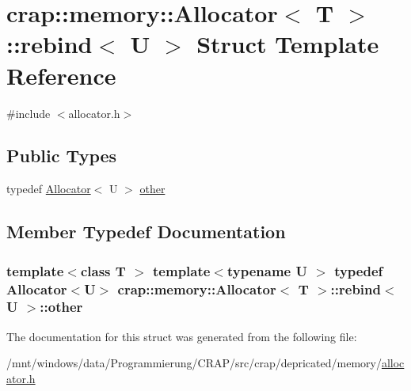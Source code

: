 \hypertarget{structcrap_1_1memory_1_1_allocator_1_1rebind}{\section{crap\-:\-:memory\-:\-:Allocator$<$ T $>$\-:\-:rebind$<$ U $>$ Struct Template Reference}
\label{structcrap_1_1memory_1_1_allocator_1_1rebind}
}


{\ttfamily \#include $<$allocator.\-h$>$}

\subsection*{Public Types}
\begin{DoxyCompactItemize}
\item 
typedef \hyperlink{classcrap_1_1memory_1_1_allocator}{Allocator}$<$ U $>$ \hyperlink{structcrap_1_1memory_1_1_allocator_1_1rebind_a39d18e669f0286955dc313a47afe61bd}{other}
\end{DoxyCompactItemize}


\subsection{Member Typedef Documentation}
\hypertarget{structcrap_1_1memory_1_1_allocator_1_1rebind_a39d18e669f0286955dc313a47afe61bd}{
\subsubsection[{other}]{\setlength{\rightskip}{0pt plus 5cm}template$<$class T $>$ template$<$typename U $>$ typedef {\bf Allocator}$<$U$>$ {\bf crap\-::memory\-::\-Allocator}$<$ T $>$\-::{\bf rebind}$<$ U $>$\-::{\bf other}}}\label{structcrap_1_1memory_1_1_allocator_1_1rebind_a39d18e669f0286955dc313a47afe61bd}


The documentation for this struct was generated from the following file\-:\begin{DoxyCompactItemize}
\item 
/mnt/windows/data/\-Programmierung/\-C\-R\-A\-P/src/crap/depricated/memory/\hyperlink{allocator_8h}{allocator.\-h}\end{DoxyCompactItemize}
